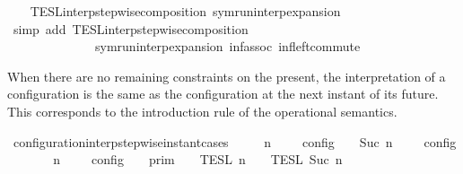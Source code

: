 \begin{isabellebody}
%
\isadelimproof
\ \ %
\endisadelimproof
%
\isatagproof
{}\isamarkupfalse%
\ TESL{\isacharunderscore}interp{\isacharunderscore}stepwise{\isacharunderscore}composition\ symrun{\isacharunderscore}interp{\isacharunderscore}expansion\isanewline
{}\isamarkupfalse%
\ {\isacharparenleft}simp\ add{\isacharcolon}\ TESL{\isacharunderscore}interp{\isacharunderscore}stepwise{\isacharunderscore}composition\isanewline
\ \ \ \ \ \ \ \ \ \ \ \ \ \ symrun{\isacharunderscore}interp{\isacharunderscore}expansion\ inf{\isacharunderscore}assoc\ inf{\isacharunderscore}left{\isacharunderscore}commute{\isacharparenright}%
\endisatagproof
{\isafoldproof}%
%
\isadelimproof
%
\endisadelimproof
%
\begin{isamarkuptext}%
When there are no remaining constraints on the present, the interpretation of
  a configuration is the same as the configuration at the next instant of its future.
  This corresponds to the introduction rule of the operational semantics.%
\end{isamarkuptext}\isamarkuptrue%
\isamarkupfalse%
\ configuration{\isacharunderscore}interp{\isacharunderscore}stepwise{\isacharunderscore}instant{\isacharunderscore}cases{\isacharcolon}\isanewline
\ \ \ {\isacartoucheopen}{\isasymlbrakk}\ {\isasymGamma}{\isacharcomma}\ n\ {\isasymTurnstile}\ {\isacharbrackleft}{\isacharbrackright}\ {\isasymtriangleright}\ {\isasymPhi}\ {\isasymrbrakk}\isactrlsub c\isactrlsub o\isactrlsub n\isactrlsub f\isactrlsub i\isactrlsub g\ {\isacharequal}\ {\isasymlbrakk}\ {\isasymGamma}{\isacharcomma}\ Suc\ n\ {\isasymTurnstile}\ {\isasymPhi}\ {\isasymtriangleright}\ {\isacharbrackleft}{\isacharbrackright}\ {\isasymrbrakk}\isactrlsub c\isactrlsub o\isactrlsub n\isactrlsub f\isactrlsub i\isactrlsub g{\isacartoucheclose}\isanewline
%
\isadelimproof
%
\endisadelimproof
%
\isatagproof
{}\isamarkupfalse%
\ {\isacharminus}\isanewline
\ \ \isamarkupfalse%
\ {\isacartoucheopen}{\isasymlbrakk}\ {\isasymGamma}{\isacharcomma}\ n\ {\isasymTurnstile}\ {\isacharbrackleft}{\isacharbrackright}\ {\isasymtriangleright}\ {\isasymPhi}\ {\isasymrbrakk}\isactrlsub c\isactrlsub o\isactrlsub n\isactrlsub f\isactrlsub i\isactrlsub g\ {\isacharequal}\ {\isasymlbrakk}{\isasymlbrakk}\ {\isasymGamma}\ {\isasymrbrakk}{\isasymrbrakk}\isactrlsub p\isactrlsub r\isactrlsub i\isactrlsub m\ {\isasyminter}\ {\isasymlbrakk}{\isasymlbrakk}\ {\isacharbrackleft}{\isacharbrackright}\ {\isasymrbrakk}{\isasymrbrakk}\isactrlsub T\isactrlsub E\isactrlsub S\isactrlsub L\isactrlbsup {\isasymge}\ n\isactrlesup \ {\isasyminter}\ {\isasymlbrakk}{\isasymlbrakk}\ {\isasymPhi}\ {\isasymrbrakk}{\isasymrbrakk}\isactrlsub T\isactrlsub E\isactrlsub S\isactrlsub L\isactrlbsup {\isasymge}\ Suc\ n\isactrlesup {\isacartoucheclose}\isanewline

\end{isabellebody}
